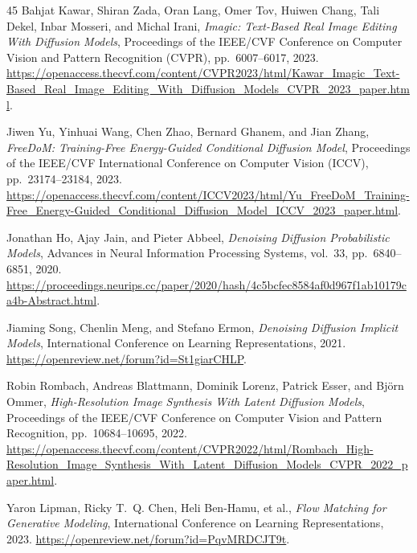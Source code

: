 \documentclass[conference]{IEEEtran}
\begin{document}
\begin{thebibliography}{45}
Bahjat Kawar, Shiran Zada, Oran Lang, Omer Tov, Huiwen Chang, Tali Dekel, Inbar Mosseri, and Michal Irani,
\textit{Imagic: Text-Based Real Image Editing With Diffusion Models},
Proceedings of the IEEE/CVF Conference on Computer Vision and Pattern Recognition (CVPR), pp.~6007--6017, 2023.
\url{https://openaccess.thecvf.com/content/CVPR2023/html/Kawar_Imagic_Text-Based_Real_Image_Editing_With_Diffusion_Models_CVPR_2023_paper.html}.

Jiwen Yu, Yinhuai Wang, Chen Zhao, Bernard Ghanem, and Jian Zhang,
\textit{FreeDoM: Training-Free Energy-Guided Conditional Diffusion Model},
Proceedings of the IEEE/CVF International Conference on Computer Vision (ICCV), pp.~23174--23184, 2023.
\url{https://openaccess.thecvf.com/content/ICCV2023/html/Yu_FreeDoM_Training-Free_Energy-Guided_Conditional_Diffusion_Model_ICCV_2023_paper.html}.


Jonathan Ho, Ajay Jain, and Pieter Abbeel,
\textit{Denoising Diffusion Probabilistic Models},
Advances in Neural Information Processing Systems, vol.~33, pp.~6840--6851, 2020.
\url{https://proceedings.neurips.cc/paper/2020/hash/4c5bcfec8584af0d967f1ab10179ca4b-Abstract.html}.

Jiaming Song, Chenlin Meng, and Stefano Ermon,
\textit{Denoising Diffusion Implicit Models},
International Conference on Learning Representations, 2021.
\url{https://openreview.net/forum?id=St1giarCHLP}.

Robin Rombach, Andreas Blattmann, Dominik Lorenz, Patrick Esser, and Bj\"orn Ommer,
\textit{High-Resolution Image Synthesis With Latent Diffusion Models},
Proceedings of the IEEE/CVF Conference on Computer Vision and Pattern Recognition, pp.~10684--10695, 2022.
\url{https://openaccess.thecvf.com/content/CVPR2022/html/Rombach_High-Resolution_Image_Synthesis_With_Latent_Diffusion_Models_CVPR_2022_paper.html}.

Yaron Lipman, Ricky T.~Q. Chen, Heli Ben-Hamu, et al.,
\textit{Flow Matching for Generative Modeling},
International Conference on Learning Representations, 2023.
\url{https://openreview.net/forum?id=PqvMRDCJT9t}.


\end{thebibliography}
\end{document}
